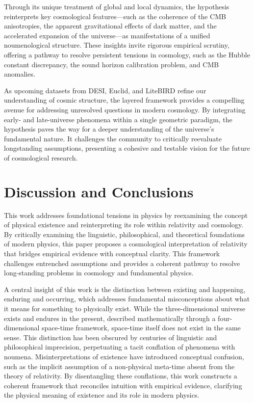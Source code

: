 \documentclass[aps,rmp,groupedaddress,twocolumn,10pt]{revtex4-2}
\begin{document}
Through its unique treatment of global and local dynamics, the hypothesis reinterprets key cosmological features---such as the coherence of the CMB anisotropies, the apparent gravitational effects of dark matter, and the accelerated expansion of the universe---as manifestations of a unified noumenological structure. These insights invite rigorous empirical scrutiny, offering a pathway to resolve persistent tensions in cosmology, such as the Hubble constant discrepancy, the sound horizon calibration problem, and CMB anomalies.

As upcoming datasets from DESI, Euclid, and LiteBIRD refine our understanding of cosmic structure, the layered framework provides a compelling avenue for addressing unresolved questions in modern cosmology. By integrating early- and late-universe phenomena within a single geometric paradigm, the hypothesis paves the way for a deeper understanding of the universe's fundamental nature. It challenges the community to critically reevaluate longstanding assumptions, presenting a cohesive and testable vision for the future of cosmological research.

\section{Discussion and Conclusions}\label{sec:conclusions}

This work addresses foundational tensions in physics by reexamining the concept of physical existence and reinterpreting its role within relativity and cosmology. By critically examining the linguistic, philosophical, and theoretical foundations of modern physics, this paper proposes a cosmological interpretation of relativity that bridges empirical evidence with conceptual clarity. This framework challenges entrenched assumptions and provides a coherent pathway to resolve long-standing problems in cosmology and fundamental physics.

A central insight of this work is the distinction between existing and happening, enduring and occurring, which addresses fundamental misconceptions about what it means for something to physically exist. While the three-dimensional universe exists and endures in the present, described mathematically through a four-dimensional space-time framework, space-time itself does not exist in the same sense. This distinction has been obscured by centuries of linguistic and philosophical imprecision, perpetuating a tacit conflation of phenomena with noumena. Misinterpretations of existence have introduced conceptual confusion, such as the implicit assumption of a non-physical meta-time absent from the theory of relativity. By disentangling these conflations, this work constructs a coherent framework that reconciles intuition with empirical evidence, clarifying the physical meaning of existence and its role in modern physics.
\end{document}
